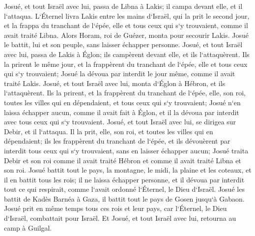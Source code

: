 \verse Josué, et tout Israël avec lui, passa de Libna à Lakis; il campa devant elle, et il l`attaqua. 
\verse L`Éternel livra Lakis entre les mains d`Israël, qui la prit le second jour, et la frappa du tranchant de l`épée, elle et tous ceux qui s`y trouvaient, comme il avait traité Libna. 
\verse Alors Horam, roi de Guézer, monta pour secourir Lakis. Josué le battit, lui et son peuple, sans laisser échapper personne. 
\verse Josué, et tout Israël avec lui, passa de Lakis à Églon; ils campèrent devant elle, et ils l`attaquèrent. 
\verse Ils la prirent le même jour, et la frappèrent du tranchant de l`épée, elle et tous ceux qui s`y trouvaient; Josué la dévoua par interdit le jour même, comme il avait traité Lakis. 
\verse Josué, et tout Israël avec lui, monta d`Églon à Hébron, et ils l`attaquèrent. 
\verse Ils la prirent, et la frappèrent du tranchant de l`épée, elle, son roi, toutes les villes qui en dépendaient, et tous ceux qui s`y trouvaient; Josué n`en laissa échapper aucun, comme il avait fait à Églon, et il la dévoua par interdit avec tous ceux qui s`y trouvaient. 
\verse Josué, et tout Israël avec lui, se dirigea sur Debir, et il l`attaqua. 
\verse Il la prit, elle, son roi, et toutes les villes qui en dépendaient; ils les frappèrent du tranchant de l`épée, et ils dévouèrent par interdit tous ceux qui s`y trouvaient, sans en laisser échapper aucun; Josué traita Debir et son roi comme il avait traité Hébron et comme il avait traité Libna et son roi. 
\verse Josué battit tout le pays, la montagne, le midi, la plaine et les coteaux, et il en battit tous les rois; il ne laissa échapper personne, et il dévoua par interdit tout ce qui respirait, comme l`avait ordonné l`Éternel, le Dieu d`Israël. 
\verse Josué les battit de Kadès Barnéa à Gaza, il battit tout le pays de Gosen jusqu`à Gabaon. 
\verse Josué prit en même temps tous ces rois et leur pays, car l`Éternel, le Dieu d`Israël, combattait pour Israël. 
\verse Et Josué, et tout Israël avec lui, retourna au camp à Guilgal. 

\chapter{}

